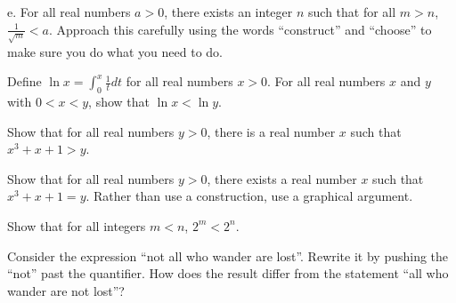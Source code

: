e. For all real numbers $a > 0$, there exists an integer $n$ such that for all $m > n$, $\frac{1}{\sqrt{m}} < a$.
Approach this carefully using the words ``construct'' and ``choose'' to make sure you do what you need to do.

\item Define $\ln x = \int_{0}^{x} \frac{1}{t} dt$ for all real numbers $x > 0$.  
For all real numbers $x$ and $y$ with $0 < x < y$, show that $\ln x < \ln y$.

\item Show that for all real numbers $y > 0$, there is a real number $x$ such that $x^3 + x + 1 > y$.

\item Show that for all real numbers $y > 0$, there exists a real number $x$ such that $x^3 + x + 1 = y$.
Rather than use a construction, use a graphical argument.

\item Show that for all integers $m < n$, $2^m < 2^n$.

\item Consider the expression ``not all who wander are lost''.  Rewrite it by pushing the ``not'' past the quantifier.
How does the result differ from the statement ``all who wander are not lost''?

\elist
\vfill          %
